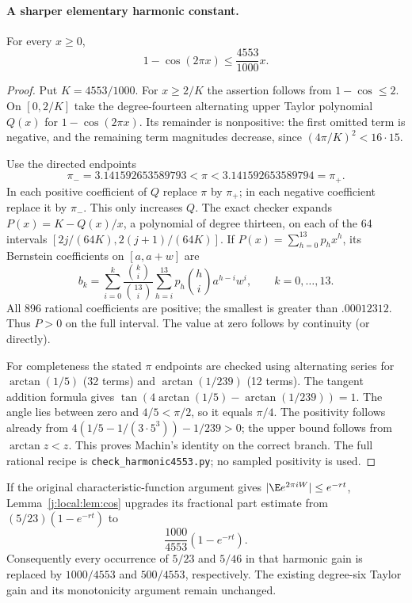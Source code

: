 \paragraph{A sharper elementary harmonic constant.}
\begin{lemma}\label{j:local:lem:cos}
For every $x\ge0$,
\[
               1-\cos(2\pi x)\le\frac{4553}{1000}x.
\]
\end{lemma}
\begin{proof}
Put $K=4553/1000$. For $x\ge2/K$ the assertion follows from
$1-\cos\le2$. On $[0,2/K]$ take the degree-fourteen alternating upper
Taylor polynomial $Q(x)$ for $1-\cos(2\pi x)$. Its remainder is nonpositive:
the first omitted term is negative, and the remaining term magnitudes
decrease, since $(4\pi/K)^2<16\cdot15$.

Use the directed endpoints
\[
 \pi_-=3.141592653589793<\pi<3.141592653589794=\pi_+.
\]
In each positive coefficient of $Q$ replace $\pi$ by $\pi_+$; in each
negative coefficient replace it by $\pi_-$. This only increases $Q$.
The exact checker expands $P(x)=K-Q(x)/x$, a polynomial of degree thirteen,
on each of the 64 intervals $[2j/(64K),2(j+1)/(64K)]$. If
$P(x)=\sum_{h=0}^{13}p_hx^h$, its Bernstein coefficients on $[a,a+w]$ are
\[
 b_k=\sum_{i=0}^k\frac{\binom ki}{\binom{13}i}
        \sum_{h=i}^{13}p_h\binom hi a^{h-i}w^i,
               \qquad k=0,\ldots,13.
\]
All 896 rational coefficients are positive; the smallest is greater than
$.00012312$. Thus $P>0$ on the full interval. The value at zero follows by
continuity (or directly).

For completeness the stated $\pi$ endpoints are checked using alternating
series for $\arctan(1/5)$ (32 terms) and $\arctan(1/239)$ (12 terms).
The tangent addition formula gives
$\tan(4\arctan(1/5)-\arctan(1/239))=1$.
The angle lies between zero and $4/5<\pi/2$, so it equals $\pi/4$.
The positivity follows already from
$4(1/5-1/(3\cdot5^3))-1/239>0$; the upper bound follows from
$\arctan z<z$. This proves Machin's identity on the correct branch.
The full rational recipe is \texttt{check\_harmonic4553.py}; no sampled
positivity is used.
\end{proof}

If the original characteristic-function argument gives
$|\E e^{2\pi iW}|\le e^{-rt}$, Lemma~\ref{j:local:lem:cos} upgrades its fractional
part estimate from $(5/23)(1-e^{-rt})$ to
\[
                 \frac{1000}{4553}(1-e^{-rt}).
\]
Consequently every occurrence of $5/23$ and $5/46$ in that harmonic gain is
replaced by $1000/4553$ and $500/4553$, respectively. The existing degree-six
Taylor gain and its monotonicity argument remain unchanged.



